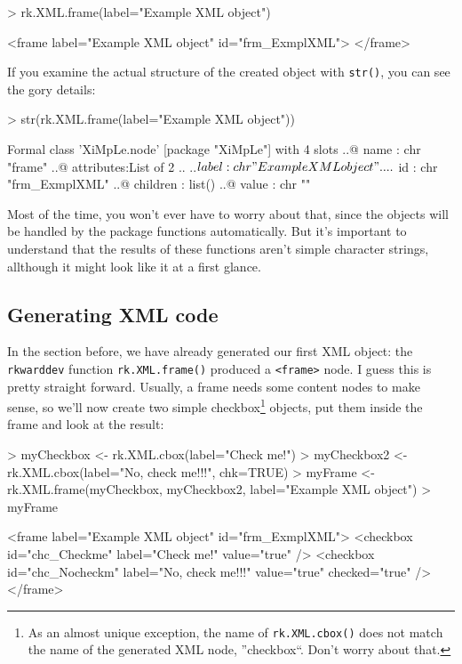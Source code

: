 \documentclass[a4paper,10pt]{scrartcl}
\begin{document}
	\begin{Schunk}
		\begin{Sinput}
> rk.XML.frame(label="Example XML object")
		\end{Sinput}
		\begin{Soutput}
<frame label="Example XML object" id="frm_ExmplXML">
</frame>
		\end{Soutput}
	\end{Schunk}

If you examine the actual structure of the created object with \texttt{str()}, you can see the gory details:

	\begin{Schunk}
		\begin{Sinput}
> str(rk.XML.frame(label="Example XML object"))
		\end{Sinput}
		\begin{Soutput}
Formal class 'XiMpLe.node' [package "XiMpLe"] with 4 slots
  ..@ name      : chr "frame"
  ..@ attributes:List of 2
  .. ..$ label: chr "Example XML object"
  .. ..$ id   : chr "frm_ExmplXML"
  ..@ children  : list()
  ..@ value     : chr ""
		\end{Soutput}
	\end{Schunk}

Most of the time, you won't ever have to worry about that, since the objects will be handled by the package functions automatically.
But it's important to understand that the results of these functions aren't simple character strings, allthough it might look like it
at a first glance.

\subsection{Generating XML code}
In the section before, we have already generated our first XML object: the \texttt{rkwarddev} function \texttt{rk.XML.frame()} produced
a \texttt{<frame>} node. I guess this is pretty straight forward. Usually, a frame needs some content nodes to make sense, so we'll now
create two simple checkbox\footnote{As an almost unique exception, the name of \texttt{rk.XML.cbox()} does not match the name of the
generated XML node, ''checkbox``. Don't worry about that.} objects, put them inside the frame and look at the result:

	\begin{Schunk}
		\begin{Sinput}
> myCheckbox <- rk.XML.cbox(label="Check me!")
> myCheckbox2 <- rk.XML.cbox(label="No, check me!!!", chk=TRUE)
> myFrame <- rk.XML.frame(myCheckbox, myCheckbox2, label="Example XML object")
> myFrame
		\end{Sinput}
		\begin{Soutput}
<frame label="Example XML object" id="frm_ExmplXML">
  <checkbox id="chc_Checkme" label="Check me!" value="true" />
  <checkbox id="chc_Nocheckm" label="No, check me!!!" value="true" checked="true" />
</frame>
		\end{Soutput}
	\end{Schunk}
\end{document}
